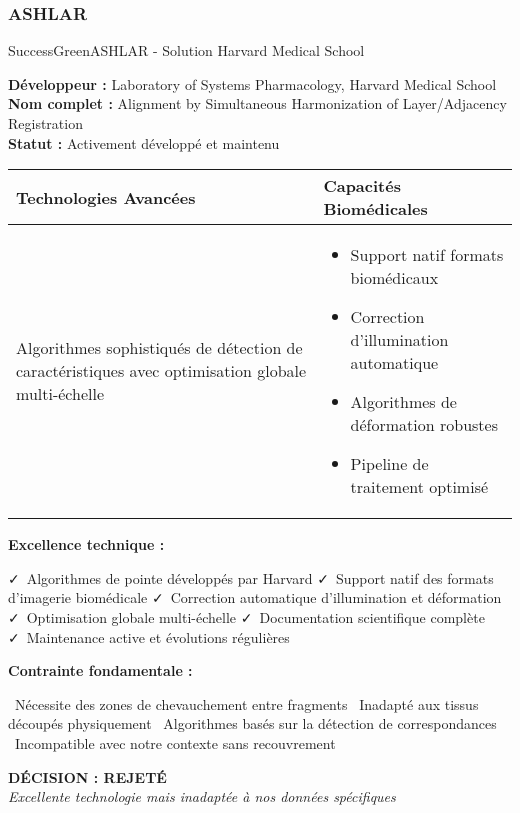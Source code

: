 \documentclass[12pt,a4paper]{report}
\newcommand{\pro}[1]{\textcolor{SuccessGreen}{\faCheck\ #1}}
\newcommand{\con}[1]{\textcolor{DangerRed}{\faTimes\ #1}}
\begin{document}
\subsubsection{ASHLAR}

\begin{techbox}{SuccessGreen}{ASHLAR - Solution Harvard Medical School}

\textbf{Développeur :} Laboratory of Systems Pharmacology, Harvard Medical School \\
\textbf{Nom complet :} Alignment by Simultaneous Harmonization of Layer/Adjacency Registration \\
\textbf{Statut :} Activement développé et maintenu

\vspace{0.5cm}

\begin{tabularx}{\textwidth}{|X|X|}
\hline
\rowcolor{LightGray}
\textbf{Technologies Avancées} & \textbf{Capacités Biomédicales} \\
\hline
Algorithmes sophistiqués de détection de caractéristiques avec optimisation globale multi-échelle &
\begin{itemize}[nosep]
\item Support natif formats biomédicaux
\item Correction d'illumination automatique
\item Algorithmes de déformation robustes
\item Pipeline de traitement optimisé
\end{itemize} \\
\hline
\end{tabularx}

\vspace{0.5cm}

\textbf{Excellence technique :}
\begin{itemize}[leftmargin=*]
    \pro{Algorithmes de pointe développés par Harvard}
    \pro{Support natif des formats d'imagerie biomédicale}
    \pro{Correction automatique d'illumination et déformation}
    \pro{Optimisation globale multi-échelle}
    \pro{Documentation scientifique complète}
    \pro{Maintenance active et évolutions régulières}
\end{itemize}

\textbf{Contrainte fondamentale :}
\begin{itemize}[leftmargin=*]
    \con{Nécessite des zones de chevauchement entre fragments}
    \con{Inadapté aux tissus découpés physiquement}
    \con{Algorithmes basés sur la détection de correspondances}
    \con{Incompatible avec notre contexte sans recouvrement}
\end{itemize}

\begin{center}
\textbf{\textcolor{WarningOrange}{DÉCISION : REJETÉ}}\\
\textit{Excellente technologie mais inadaptée à nos données spécifiques}
\end{center}

\end{techbox}
\end{document}
